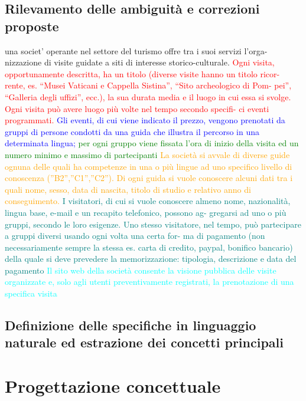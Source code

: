 \documentclass[a4paper,12pt]{report}
\begin{document}
\section{Rilevamento delle ambiguità e correzioni proposte}
una societ' operante nel settore del turismo offre tra i suoi servizi l’orga-
nizzazione di visite guidate a siti di interesse storico-culturale.
\textcolor{red}{ Ogni visita,
opportunamente descritta, ha un titolo (diverse visite hanno un titolo ricor-
rente, es. “Musei Vaticani e Cappella Sistina”, “Sito archeologico di Pom-
pei”, “Galleria degli uffizi”, ecc.), la sua durata media e il luogo in cui essa
si svolge. Ogni visita può avere luogo più volte nel tempo secondo specifi-
ci eventi programmati. } 
\textcolor{blue}{Gli eventi, di cui viene indicato il prezzo, vengono
prenotati da gruppi di persone condotti da una guida che illustra il percorso
in una determinata lingua;} 
\textcolor{green}{per ogni gruppo viene fissata l’ora di inizio della
visita ed un numero minimo e massimo di partecipanti} 
\textcolor{orange}{La società si avvale
di diverse guide ognuna delle quali ha competenze in una o più 
lingue ad
uno specifico livello di conoscenza (”B2”,”C1”,”C2”). Di ogni guida si vuole
conoscere alcuni dati tra i quali nome, sesso, data di nascita, titolo di studio
e relativo anno di conseguimento.} 
\textcolor{teal}{ I visitatori, di cui si vuole conoscere almeno
nome, nazionalità, lingua base, e-mail e un recapito telefonico, possono ag-
gregarsi ad uno o più gruppi, secondo le loro esigenze. Uno stesso visitatore,
nel tempo, può partecipare a gruppi diversi usando ogni volta una certa for-
ma di pagamento (non necessariamente sempre la stessa es. carta di credito,
paypal, bonifico bancario) della quale si deve prevedere la memorizzazione:
tipologia, descrizione e data del pagamento} 
\textcolor{cyan}{ Il sito web della società consente
la visione pubblica delle visite organizzate e, solo agli utenti preventivamente
registrati, la prenotazione di una specifica visita} 

\section{Definizione delle specifiche in linguaggio naturale ed estrazione dei concetti principali}
\newpage
\chapter{Progettazione concettuale}
\end{document}
